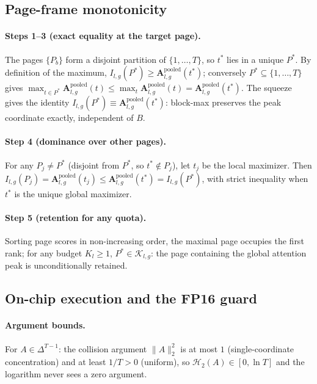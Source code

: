 \documentclass[final,5p,times,twocolumn]{elsarticle}
\theoremstyle{definition}
\theoremstyle{remark}
\newcommand{\AttnPool}[2]{\mathbf{A}^{\mathrm{pooled}}_{#1,#2}}
\newcommand{\Renyi}[2]{\mathcal{H}_{#1}\!\left(#2\right)}
\newcommand{\RetSet}[2]{\mathcal{K}_{#1,#2}}
\begin{document}
\subsection{Page-frame monotonicity}
\label{app:monotone}

\paragraph{Steps 1--3 (exact equality at the target page).}
The pages $\{P_b\}$ form a disjoint partition of $\{1,\dots,T\}$, so
 $t^{*}$ lies in a unique $P^{*}$. By definition of the maximum,
 $I_{l,g}(P^{*}) \ge \AttnPool{l}{g}(t^{*})$; conversely
 $P^{*} \subseteq \{1,\dots,T\}$ gives
 $\max_{t\in P^{*}}\AttnPool{l}{g}(t) \le \max_{t}\AttnPool{l}{g}(t) =
\AttnPool{l}{g}(t^{*})$. The squeeze gives the identity
 $I_{l,g}(P^{*}) \equiv \AttnPool{l}{g}(t^{*})$: block-max preserves
the peak coordinate exactly, independent of $B$.

\paragraph{Step 4 (dominance over other pages).}
For any $P_j \neq P^{*}$ (disjoint from $P^{*}$, so
 $t^{*}\notin P_j$), let $t_j$ be the local maximizer. Then
 $I_{l,g}(P_j) = \AttnPool{l}{g}(t_j) \le \AttnPool{l}{g}(t^{*}) =
I_{l,g}(P^{*})$, with strict inequality when $t^{*}$ is the unique
global maximizer.

\paragraph{Step 5 (retention for any quota).}
Sorting page scores in non-increasing order, the maximal page occupies
the first rank; for any budget $K_l \ge 1$,
 $P^{*} \in \RetSet{l}{g}$: the page containing the global attention
peak is unconditionally retained.

\subsection{On-chip execution and the FP16 guard}
\label{app:fp16}

\paragraph{Argument bounds.}
For $A \in \Delta^{T-1}$: the collision argument $\|A\|_2^2$ is at
most $1$ (single-coordinate concentration) and at least $1/T > 0$ (uniform), so $\Renyi{2}{A} \in [0, \ln T]$ and the logarithm never
sees a zero argument.
\end{document}

